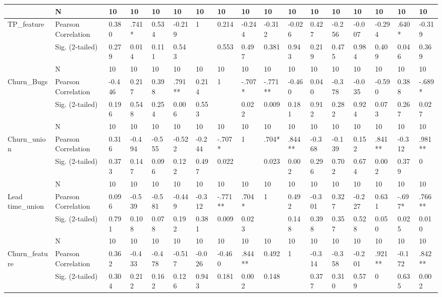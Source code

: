 \documentclass[UKenglish]{ifimaster}  %
\begin{document}
\begin{table}[!htbp]
\begin{adjustwidth}{-2.5cm}{}
{\begin{tabular}{ | l | l | l | l | l | l | l | l | l | l | l | l | l | l | l | l | l | }
	 & N & 10 & 10 & 10 & 10 & 10 & 10 & 10 & 10 & 10 & 10 & 10 & 10 & 10 & 10 & 10 \\ \hline
	TP\_feature & Pearson Correlation & 0.380 & .741* & 0.534 & -0.219 & 1 & 0.214 & -0.244 & -0.312 & -0.026 & 0.427 & -0.256 & -0.007 & -0.294 & .640* & -0.319\\ \hline
	 & Sig. (2-tailed) & 0.279 & 0.014 & 0.111 & 0.543 &  & 0.553 & 0.497 & 0.381 & 0.943 & 0.219 & 0.475 & 0.984 & 0.409 & 0.046 & 0.369\\ \hline
	 & N & 10 & 10 & 10 & 10 & 10 & 10 & 10 & 10 & 10 & 10 & 10 & 10 & 10 & 10 & 10 \\ \hline
	Churn\_Bugs & Pearson Correlation & -0.446 & 0.217 & 0.398 & .791** & 0.214 & 1 & -.707* & -.771** & -0.460 & 0.040 & -0.378 & -0.035 & -0.590 & 0.388 & -.689* \\ \hline
	 & Sig. (2-tailed) & 0.196 & 0.548 & 0.254 & 0.006 & 0.553 &  & 0.022 & 0.009 & 0.181 & 0.912 & 0.282 & 0.924 & 0.073 & 0.267 & 0.027\\ \hline
	 & N & 10 & 10 & 10 & 10 & 10 & 10 & 10 & 10 & 10 & 10 & 10 & 10 & 10 & 10 & 10 \\ \hline
	Churn\_union & Pearson Correlation & 0.316 & -0.494 & -0.555 & -0.522 & -0.244 & -.707* & 1 & .704* & .844** & -0.368 & -0.139 & 0.152 & .841** & -0.312 & .981** \\ \hline
	 & Sig. (2-tailed) & 0.373 & 0.147 & 0.096 & 0.122 & 0.497 & 0.022 &  & 0.023 & 0.002 & 0.296 & 0.702 & 0.674 & 0.002 & 0.379 & 0\\ \hline
	 & N & 10 & 10 & 10 & 10 & 10 & 10 & 10 & 10 & 10 & 10 & 10 & 10 & 10 & 10 & 10 \\ \hline
	Lead time\_union & Pearson Correlation & 0.096 & -0.539 & -0.581 & -0.449 & -0.312 & -.771** & .704* & 1 & 0.492 & -0.301 & 0.327 & -0.227 & 0.631 & -.697* & .766** \\ \hline
	 & Sig. (2-tailed) & 0.791 & 0.108 & 0.078 & 0.192 & 0.381 & 0.009 & 0.023 &  & 0.148 & 0.398 & 0.357 & 0.528 & 0.050 & 0.025 & 0.010\\ \hline
	 & N & 10 & 10 & 10 & 10 & 10 & 10 & 10 & 10 & 10 & 10 & 10 & 10 & 10 & 10 & 10 \\ \hline
	Churn\_feature & Pearson Correlation & 0.362 & -0.433 & -0.478 & -0.517 & -0.026 & -0.460 & .844** & 0.492 & 1 & -0.314 & -0.358 & -0.201 & .921** & -0.172 & .842** \\ \hline
	 & Sig. (2-tailed) & 0.304 & 0.212 & 0.162 & 0.126 & 0.943 & 0.181 & 0.002 & 0.148 &  & 0.377 & 0.310 & 0.579 & 0 & 0.635 & 0.002\\ \hline

\end{tabular}}
\end{adjustwidth}
\end{table}
\end{document}
